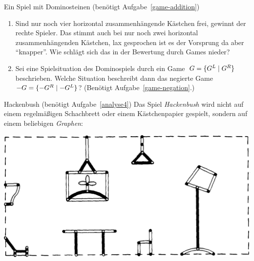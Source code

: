 \documentclass{zirkelblatt}
\begin{document}
\begin{aufgabe}{Ein Spiel mit Dominosteinen (benötigt Aufgabe~\ref{game-addition})}
\begin{enumerate}
von Teilaufgabe~c) sofort das Game zu folgender Situation anzugeben. Welcher
Spieler besitzt eine Gewinnstrategie?
\[
  \begin{Young}
    \cr
    \cr
    &\cr
  \end{Young}
  \begin{array}{@{}c@{}}\begin{Young}
    &&&\cr
  \end{Young}\\[7.2em]\end{array}
  \hspace{-3.7em}
  \begin{Young}
    \cr
    \cr
  \end{Young}
\]
\vspace{-5em}
\item Sind nur noch vier horizontal zusammenhängende Kästchen frei, gewinnt der
rechte Spieler. Das stimmt auch bei nur noch zwei horizontal zusammenhängenden
Kästchen, lax gesprochen ist es der Vorsprung da aber "`knapper"'. Wie schlägt
sich das in der Bewertung durch Games nieder?
\item Sei eine Spielsituation des Dominospiels durch ein Game~$G =
\{ G^L \mathrel{|} G^R \}$ beschrieben.
Welche Situation beschreibt dann das negierte Game~$-G = \{ -G^R \mathrel{|} -G^L \}$?
(Benötigt Aufgabe~\ref{game-negation}.)
\end{enumerate}
\end{aufgabe}

\begin{aufgabe}{Hackenbush (benötigt Aufgabe~\ref{analyse4})}
\label{game-hackenbush}
Das Spiel \emph{Hackenbush} wird nicht auf einem regelmäßigen Schachbrett oder
einem Kästchenpapier gespielt, sondern auf einem beliebigen \emph{Graphen}:
\begin{center}
\includegraphics[scale=0.25]{hackenbush}
\end{center}
\end{aufgabe}
\end{document}
